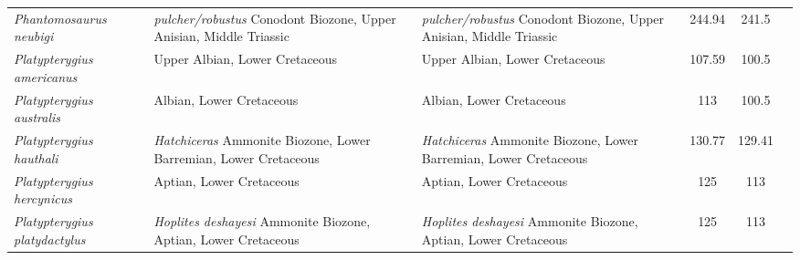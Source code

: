 \begin{longtabu}{>{\itshape}lXXSSl}
	Phantomosaurus neubigi                               & \emph{pulcher/robustus} Conodont Biozone, Upper Anisian, Middle Triassic                                                           & \emph{pulcher/robustus} Conodont Biozone, Upper Anisian, Middle Triassic                                                           & 244.94                   & 241.5                    & \cite{Sander1997} \\                     
	Platypterygius americanus                            & Upper Albian, Lower Cretaceous                                                                                                     & Upper Albian, Lower Cretaceous                                                                                                     & 107.59                   & 100.5                    & \cite{Romer1968} \\                      
	Platypterygius australis                             & Albian, Lower Cretaceous                                                                                                           & Albian, Lower Cretaceous                                                                                                           & 113                      & 100.5                    & \cite{Wade1984,Wade1990} \\              
	Platypterygius hauthali                              & \emph{Hatchiceras} Ammonite Biozone, Lower Barremian, Lower Cretaceous                                                             & \emph{Hatchiceras} Ammonite Biozone, Lower Barremian, Lower Cretaceous                                                             & 130.77                   & 129.41                   & \cite{Fernandez2005} \\                  
	Platypterygius hercynicus                            & Aptian, Lower Cretaceous                                                                                                           & Aptian, Lower Cretaceous                                                                                                           & 125                      & 113                      & \cite{Kolb2009} \\                       
	Platypterygius platydactylus                         & \emph{Hoplites deshayesi} Ammonite Biozone, Aptian, Lower Cretaceous                                                               & \emph{Hoplites deshayesi} Ammonite Biozone, Aptian, Lower Cretaceous                                                               & 125                      & 113                      & \cite{Broili1908} \\                     

\end{longtabu}
